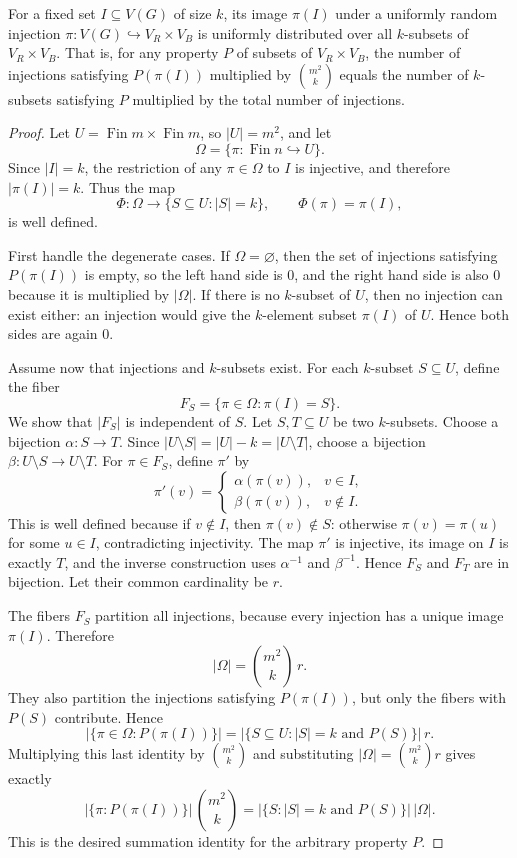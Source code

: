 \begin{helper}
For a fixed set \(I\subseteq V(G)\) of size \(k\), its image \(\pi(I)\) under a uniformly random injection \(\pi : V(G) \hookrightarrow V_R \times V_B\) is uniformly distributed over all \(k\)-subsets of \(V_R \times V_B\). That is, for any property \(P\) of subsets of \(V_R \times V_B\), the number of injections satisfying \(P(\pi(I))\) multiplied by \(\binom{m^2}{k}\) equals the number of \(k\)-subsets satisfying \(P\) multiplied by the total number of injections.
\end{helper}
\begin{proof}
Let \(U=\operatorname{Fin}m\times\operatorname{Fin}m\), so
\(|U|=m^2\), and let
\[
\Omega=\{\pi:\operatorname{Fin}n\hookrightarrow U\}.
\]
Since \(|I|=k\), the restriction of any \(\pi\in\Omega\) to \(I\) is
injective, and therefore \(|\pi(I)|=k\).  Thus the map
\[
\Phi:\Omega\to\{S\subseteq U:|S|=k\},\qquad \Phi(\pi)=\pi(I),
\]
is well defined.

First handle the degenerate cases.  If \(\Omega=\varnothing\), then the set
of injections satisfying \(P(\pi(I))\) is empty, so the left hand side is
\(0\), and the right hand side is also \(0\) because it is multiplied by
\(|\Omega|\).  If there is no \(k\)-subset of \(U\), then no injection can
exist either: an injection would give the \(k\)-element subset \(\pi(I)\) of
\(U\).  Hence both sides are again \(0\).

Assume now that injections and \(k\)-subsets exist.  For each \(k\)-subset
\(S\subseteq U\), define the fiber
\[
F_S=\{\pi\in\Omega:\pi(I)=S\}.
\]
We show that \(|F_S|\) is independent of \(S\).  Let \(S,T\subseteq U\) be
two \(k\)-subsets.  Choose a bijection \(\alpha:S\to T\).  Since
\(|U\setminus S|=|U|-k=|U\setminus T|\), choose a bijection
\(\beta:U\setminus S\to U\setminus T\).  For \(\pi\in F_S\), define
\(\pi'\) by
\[
\pi'(v)=
\begin{cases}
\alpha(\pi(v)), & v\in I,\\
\beta(\pi(v)), & v\notin I.
\end{cases}
\]
This is well defined because if \(v\notin I\), then \(\pi(v)\notin S\):
otherwise \(\pi(v)=\pi(u)\) for some \(u\in I\), contradicting injectivity.
The map \(\pi'\) is injective, its image on \(I\) is exactly \(T\), and the
inverse construction uses \(\alpha^{-1}\) and \(\beta^{-1}\).  Hence
\(F_S\) and \(F_T\) are in bijection.  Let their common cardinality be \(r\).

The fibers \(F_S\) partition all injections, because every injection has a
unique image \(\pi(I)\).  Therefore
\[
|\Omega|=\binom{m^2}{k}\,r.
\]
They also partition the injections satisfying \(P(\pi(I))\), but only the
fibers with \(P(S)\) contribute.  Hence
\[
|\{\pi\in\Omega:P(\pi(I))\}|
=|\{S\subseteq U:|S|=k\text{ and }P(S)\}|\,r.
\]
Multiplying this last identity by \(\binom{m^2}{k}\) and substituting
\(|\Omega|=\binom{m^2}{k}r\) gives exactly
\[
|\{\pi:P(\pi(I))\}|\,\binom{m^2}{k}
=|\{S:|S|=k\text{ and }P(S)\}|\,|\Omega|.
\]
This is the desired summation identity for the arbitrary property \(P\).
\end{proof}
